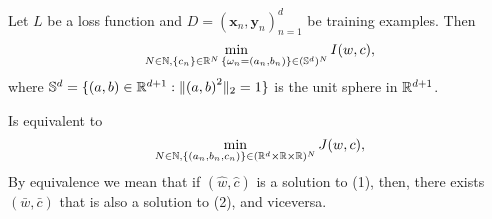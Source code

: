 \documentclass[twoside]{article}
\begin{document}
\begin{theorem}
	Let $L$ be a loss function and $D = (\bm{x}_{n}, \bm{y}_{n})_{n=1}^{d}$ be training examples. Then
	\begin{equation}
		\min_{N \in \mathbb{N}, \{c_{n}\} \in \mathbb{R}^{N}\, \{\omega_{n} = (a_{n}, b_{n})\} \in (\mathbb{S}^{d})^{N}}
		I(w, c),
	\end{equation}
	where $\mathbb{S}^{d} = \{(a,b) \in \mathbb{R}^{d + 1} : \lVert {(a,b)}^{2} \rVert_{2} = 1\}$ is the unit sphere in $\mathbb{R}^{d + 1}$.

	Is equivalent to
	\begin{equation}
		\min_{N \in \mathbb{N}, \{(a_{n}, b_{n}, c_{n})\}\in (\mathbb{R}^{d} \times \mathbb{R} \times \mathbb{R})^{N}}
		J(w, c),
	\end{equation}
	By equivalence we mean that
	if $(\hat{w}, \hat{c})$ is a solution to (1), then, there exists
	$(\bar{w}, \bar{c})$ that is also a solution to (2), and viceversa.
\end{theorem}
\end{document}
